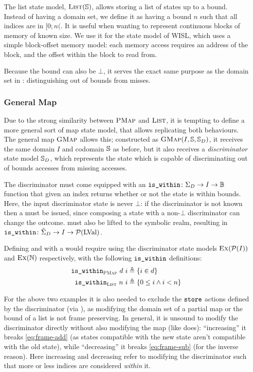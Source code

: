 The list state model, $\textsc{List}(\mathbb S)$, allows storing a list of states up to a bound. Instead of having a domain set, we define it as having a bound $n$ such that all indices are in $[0;n($. It is useful when wanting to represent continuous blocks of memory of known size. We use it for the state model of WISL, which uses a simple block-offset memory model: each memory access requires an address of the block, and the offset within the block to read from.

Because the bound can also be $\bot$, it serves the exact same purpose as the domain set in \PMap{}: distinguishing out of bounds from misses.

\subsubsection{General Map}

Due to the strong similarity between $\textsc{PMap}$ and $\textsc{List}$, it is tempting to define a more general sort of map state model, that allows replicating both behaviours. The general map $\textsc{GMap}$ allows this; constructed as $\textsc{GMap}(I,\mathbb S,\mathbb S_D)$, it receives the same domain $I$ and codomain $\mathbb S$ as before, but it also receives a \emph{discriminator} state model $\mathbb S_D$, which represents the state which is capable of discriminating out of bounds accesses from missing accesses.

The discriminator must come equipped with an $\texttt{is\_within}\colon \Sigma_D \rightarrow I \rightarrow \mathbb{B}$ function that given an index returns whether or not the state is within bounds. Here, the input discriminator state is never $\bot$: if the discriminator is not known then a \Miss{} must be issued, since composing a state with a non-$\bot$ discriminator can change the outcome.  must also be lifted to the symbolic realm, resulting in $\texttt{is\_within}\colon \hat{\Sigma}_D\rightarrow I\rightarrow {\cal P}(\text{LVal})$.

Defining \PMap{} and \List{} with a \GMap{} would require using the discriminator state models $\textsc{Ex}({\cal P}(I))$ and $\textsc{Ex}(\mathbb N)$ respectively, with the following $\texttt{is\_within}$ definitions: \begin{align*}
	\texttt{is\_within}_{\textsc{PMap}}~d~i&\triangleq \{i\in d\}\\
	\texttt{is\_within}_{\textsc{List}}~n~i&\triangleq \{0 \leq i \land i < n\}
\end{align*}

For the above two examples it is also needed to exclude the $\texttt{store}$ actions defined by the discriminator (via \Ex), as modifying the domain set of a partial map or the bound of a list is not frame preserving. In general, it is unsound to modify the discriminator directly without also modifying the map (like \alloc{} does): ``increasing'' it breaks \ref{eq:frame-add} (as states compatible with the new state aren't compatible with the old state), while ``decreasing'' it breaks \ref{eq:frame-sub} (for the inverse reason). Here increasing and decreasing refer to modifying the discriminator such that more or less indices are considered \emph{within} it.

